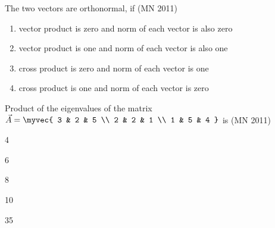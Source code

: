 \item The two vectors are orthonormal, if
	\hfill(MN 2011)
	\begin{enumerate}
    \item vector product is zero and norm of each vector is also zero
    \item vector product is one and norm of each vector is also one
    \item cross product is zero and norm of each vector is one
    \item cross product is one and norm of each vector is zero
\end{enumerate}
\item 
Product of the eigenvalues of the matrix 
$\vec{A} = \myvec{
3 & 2 & 5 \\
2 & 2 & 1 \\
1 & 5 & 4
}$
is
\hfill(MN 2011)
\begin{enumerate}
\end{enumerate}

